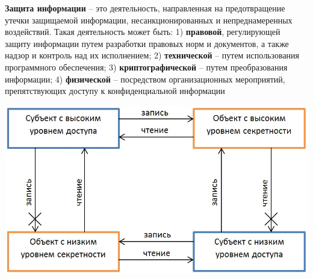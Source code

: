 \textbf{Защита информации} – это деятельность, направленная на предотвращение утечки защищаемой информации, несанкционированных и непреднамеренных воздействий. Такая деятельность может быть: 1) \textbf{правовой}, регулирующей защиту информации путем разработки правовых норм и документов, а также надзор и контроль над их исполнением; 2) \textbf{технической} – путем использования программного обеспечения; 3) \textbf{криптографической} – путем преобразования информации; 4) \textbf{физической} – посредством организационных мероприятий, препятствующих доступу к конфиденциальной информации

\includegraphics[scale=0.4]{pics/bella.png}




